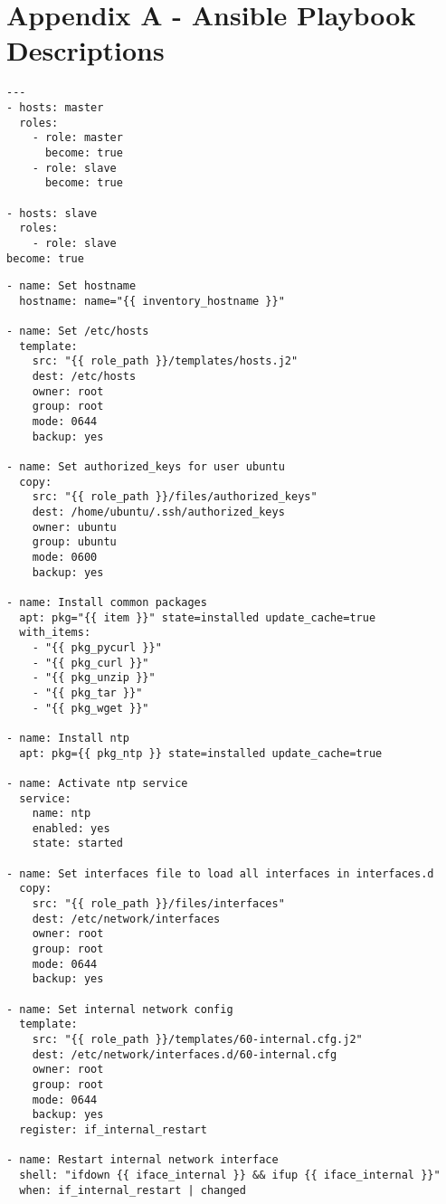 
\chapter{Appendix A - Ansible Playbook Descriptions}

\lstset{language=sh}
\begin{lstlisting}[caption={Ansible playbook that gets run to install the cluster system}, label={lst:allplaybook}]
---
- hosts: master
  roles:
    - role: master
      become: true
    - role: slave
      become: true

- hosts: slave
  roles:
    - role: slave
become: true
\end{lstlisting}

\lstset{language=sh}
\begin{lstlisting}[caption={Common tasks in Ansible}, label={lst:commontasks}]
- name: Set hostname
  hostname: name="{{ inventory_hostname }}"

- name: Set /etc/hosts
  template:
    src: "{{ role_path }}/templates/hosts.j2"
    dest: /etc/hosts
    owner: root
    group: root
    mode: 0644
    backup: yes

- name: Set authorized_keys for user ubuntu
  copy:
    src: "{{ role_path }}/files/authorized_keys"
    dest: /home/ubuntu/.ssh/authorized_keys
    owner: ubuntu
    group: ubuntu
    mode: 0600
    backup: yes

- name: Install common packages
  apt: pkg="{{ item }}" state=installed update_cache=true
  with_items:
    - "{{ pkg_pycurl }}"
    - "{{ pkg_curl }}"
    - "{{ pkg_unzip }}"
    - "{{ pkg_tar }}"
    - "{{ pkg_wget }}"

- name: Install ntp
  apt: pkg={{ pkg_ntp }} state=installed update_cache=true

- name: Activate ntp service
  service:
    name: ntp
    enabled: yes
    state: started

- name: Set interfaces file to load all interfaces in interfaces.d
  copy:
    src: "{{ role_path }}/files/interfaces"
    dest: /etc/network/interfaces
    owner: root
    group: root
    mode: 0644
    backup: yes

- name: Set internal network config
  template:
    src: "{{ role_path }}/templates/60-internal.cfg.j2"
    dest: /etc/network/interfaces.d/60-internal.cfg
    owner: root
    group: root
    mode: 0644
    backup: yes
  register: if_internal_restart

- name: Restart internal network interface
  shell: "ifdown {{ iface_internal }} && ifup {{ iface_internal }}"
  when: if_internal_restart | changed


\end{lstlisting}
